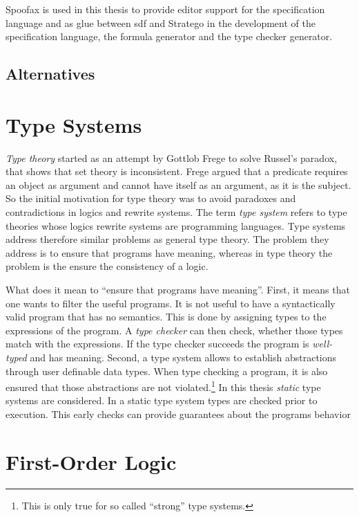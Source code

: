 Spoofax is used in this thesis to provide editor support for the
specification language and as glue between \gls{sdf} and Stratego in the
development of the specification language, the formula generator and
the type checker generator.
\subsection{Alternatives}
\section{Type Systems}
\textit{Type theory} started as an attempt by Gottlob Frege to solve Russel's
paradox, that shows that \naive{} set theory is inconsistent. Frege
argued that a predicate requires an object as argument and cannot have
itself as an argument, as it is the subject. So the initial motivation for type theory was to avoid
paradoxes and contradictions in logics and rewrite systems. The term
\textit{type system} refers to type theories whose logics rewrite
systems are programming languages. Type systems address therefore
similar problems as general type theory. The problem they address is
to ensure that programs have meaning, whereas in type theory the
problem is the ensure the consistency of a logic.

What does it mean to ``ensure that programs have meaning''. First, it
means that one wants to filter the useful programs. It is not useful
to have a syntactically valid program that has no semantics. This is
done by assigning types to the expressions of the program. A
\textit{type checker} can then check, whether those types match with
the expressions. If the type checker succeeds the program is
\textit{well-typed} and has meaning. Second, a type system allows to
establish abstractions through user definable data types. When type
checking a program, it is also ensured that those abstractions are not
violated.\footnote{This is only true for so called ``strong'' type
  systems.} In this thesis \textit{static} type systems are
considered. In a static type system types are checked prior to
execution. This early checks can provide guarantees about the programs
behavior 
\section{First-Order Logic}

